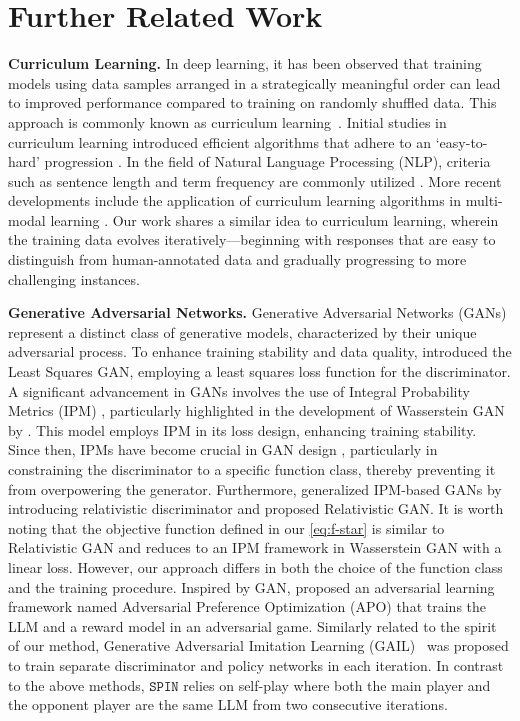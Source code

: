 \documentclass{article}
\newcommand{\method}{\texttt{SPIN}}
\begin{document}
\section{Further Related Work}
\noindent \textbf{Curriculum Learning.} 
In deep learning, it has been observed that training models using data samples arranged in a strategically meaningful order can lead to improved performance compared to training on randomly shuffled data. 
This approach is commonly known as curriculum learning~\citep{bengio2009curriculum,soviany2022curriculum}. 
Initial studies in curriculum learning introduced efficient algorithms that adhere to an `easy-to-hard' progression \citep{valentin2009babysteps,kumar2010self,lee2011learning,zhang2015self}. 
In the field of Natural Language Processing (NLP), criteria such as sentence length and term frequency are commonly utilized \citep{cirik2016visualizing,zhang2018empirical,liu2018curriculum}. 
More recent developments include the application of curriculum learning algorithms in multi-modal learning \citep{liu2021competence,wu2022scaling}.
Our work shares a similar idea to curriculum learning, wherein the training data evolves iteratively—beginning with responses that are easy to distinguish from human-annotated data and gradually progressing to more challenging instances.

\noindent\textbf{Generative Adversarial Networks.} Generative Adversarial Networks (GANs) \citep{goodfellow2014generative} represent a distinct class of generative models, characterized by their unique adversarial process. 
To enhance training stability and data quality, \citet{mao2017least} introduced the Least Squares GAN, employing a least squares loss function for the discriminator. 
A significant advancement in GANs involves the use of Integral Probability Metrics (IPM) \citep{muller1997integral}, particularly highlighted in the development of Wasserstein GAN by \citet{arjovsky2017wasserstein}. 
This model employs IPM in its loss design, enhancing training stability.  
Since then, IPMs have become crucial in GAN design \citep{mroueh2017fisher, gulrajani2017improved}, particularly in constraining the discriminator to a specific function class, thereby preventing it from overpowering the generator. 
Furthermore, \citet{jolicoeur2018relativistic} generalized IPM-based GANs by introducing relativistic discriminator and proposed Relativistic GAN. 
It is worth noting that the objective function defined in our \eqref{eq:f-star} is similar to Relativistic GAN \citep{jolicoeur2018relativistic} and reduces to an IPM framework in Wasserstein GAN \citep{arjovsky2017wasserstein} with a linear loss. However, our approach differs in both the choice of the function class and the training procedure. 
Inspired by GAN, \citet{cheng2023adversarial} proposed an adversarial learning framework named Adversarial Preference Optimization
(APO) that trains the LLM and a reward model in an adversarial game. 
Similarly related to the spirit of our method, Generative Adversarial Imitation Learning (GAIL)~\citep{ho2016generative} was proposed to train separate discriminator and policy networks in each iteration. 
In contrast to the above methods, $\method$ relies on self-play where both the main player and the opponent player are the same LLM from two consecutive iterations.
\end{document}
